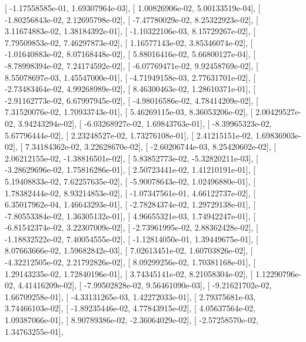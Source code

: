 \documentclass{article}
\begin{document}
       [ -1.17558585e-01,   1.69307964e-03],
       [  1.00826906e-02,   5.00133519e-04],
       [ -1.80256843e-02,   2.12695798e-02],
       [ -7.47780029e-02,   8.25322923e-02],
       [  3.11674883e-02,   1.38184392e-01],
       [ -1.10322106e-03,   8.15729267e-02],
       [  7.79509853e-02,   7.46297873e-02],
       [  1.16577143e-02,   3.85346074e-02],
       [ -1.01640883e-02,   8.07168448e-02],
       [  5.88016416e-02,   5.66800127e-04],
       [ -8.78998394e-02,   7.24174592e-02],
       [ -6.07769471e-02,   9.92458769e-02],
       [  8.55078697e-03,   1.45547000e-01],
       [ -4.71949158e-03,   2.77631701e-02],
       [ -2.73483464e-02,   4.99268989e-02],
       [  8.46300463e-02,   1.28610371e-01],
       [ -2.91162773e-02,   6.67997945e-02],
       [ -4.98016586e-02,   4.78414209e-02],
       [  7.31520076e-02,   1.70933743e-01],
       [  5.46269115e-03,   8.36053206e-02],
       [  2.00429527e-02,   3.94243294e-02],
       [ -6.03268927e-02,   1.69843763e-01],
       [ -8.39965323e-02,   5.67796444e-02],
       [  2.23248527e-02,   1.73276108e-01],
       [  2.41215151e-02,   1.69836903e-02],
       [  7.34184362e-02,   3.22628670e-02],
       [ -2.60206744e-03,   8.25420602e-02],
       [  2.06212155e-02,  -1.38816501e-02],
       [  5.83852773e-02,  -5.32820211e-03],
       [ -3.28629696e-02,   1.75816286e-01],
       [  2.50723441e-02,   1.41210191e-01],
       [  5.19408833e-02,   7.62257635e-02],
       [ -5.90078643e-02,   1.02496880e-01],
       [  1.78382444e-02,   8.93214853e-02],
       [ -1.07347561e-01,   4.66122737e-02],
       [  6.35017962e-04,   1.46643293e-01],
       [ -2.78284374e-02,   1.29729138e-01],
       [ -7.80553384e-02,   1.36305132e-01],
       [  4.96655321e-03,   1.74942247e-01],
       [ -6.81542374e-02,   3.22307009e-02],
       [ -2.73961995e-02,   2.88362428e-02],
       [ -1.18832522e-02,   7.40054555e-02],
       [ -1.12814050e-01,   1.39449675e-01],
       [  8.07663666e-02,   1.59682842e-03],
       [  7.02613451e-02,   1.60703826e-02],
       [ -4.32212505e-02,   2.21792826e-02],
       [  8.09299256e-02,   1.70381168e-01],
       [  1.29143235e-02,   1.72840196e-01],
       [  3.74345141e-02,   8.21058304e-02],
       [  1.12290796e-02,   4.41416209e-02],
       [ -7.99502828e-02,   9.56461090e-03],
       [ -9.21621702e-02,   1.66709258e-01],
       [ -4.33131265e-03,   1.42272033e-01],
       [  2.79375681e-03,   3.74466103e-02],
       [ -1.89235446e-02,   4.77843915e-02],
       [  4.05637564e-02,   1.09387066e-01],
       [  8.90789386e-02,  -2.36064029e-02],
       [ -2.57258570e-02,   1.34763255e-01],
\end{document}
